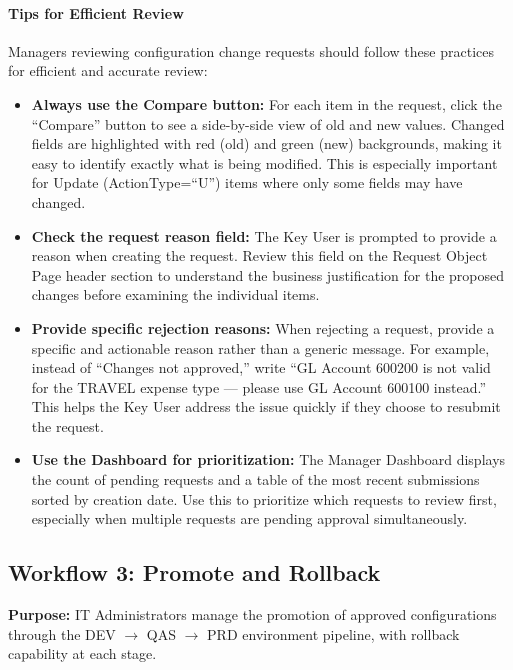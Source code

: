 \documentclass[12pt,a4paper]{report}
\begin{document}
\paragraph{Tips for Efficient Review}

Managers reviewing configuration change requests should follow these practices for efficient and accurate review:

\begin{itemize}[leftmargin=2em]
  \item \textbf{Always use the Compare button:} For each item in the request, click the ``Compare'' button to see a side-by-side view of old and new values. Changed fields are highlighted with red (old) and green (new) backgrounds, making it easy to identify exactly what is being modified. This is especially important for Update (ActionType=``U'') items where only some fields may have changed.
  \item \textbf{Check the request reason field:} The Key User is prompted to provide a reason when creating the request. Review this field on the Request Object Page header section to understand the business justification for the proposed changes before examining the individual items.
  \item \textbf{Provide specific rejection reasons:} When rejecting a request, provide a specific and actionable reason rather than a generic message. For example, instead of ``Changes not approved,'' write ``GL Account 600200 is not valid for the TRAVEL expense type --- please use GL Account 600100 instead.'' This helps the Key User address the issue quickly if they choose to resubmit the request.
  \item \textbf{Use the Dashboard for prioritization:} The Manager Dashboard displays the count of pending requests and a table of the most recent submissions sorted by creation date. Use this to prioritize which requests to review first, especially when multiple requests are pending approval simultaneously.
\end{itemize}


\subsection{Workflow 3: Promote and Rollback}

\textbf{Purpose:} IT Administrators manage the promotion of approved configurations through the DEV $\rightarrow$ QAS $\rightarrow$ PRD environment pipeline, with rollback capability at each stage.
\end{document}
